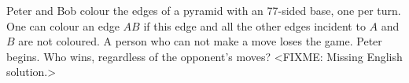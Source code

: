 \problem
Peter and Bob colour the edges of a pyramid with an 77-sided base, one per
turn.
One can colour an edge $AB$ if this edge and all the other edges incident to
$A$ and $B$ are not coloured.
A person who can not make a move loses the game.
Peter begins.
Who wins, regardless of the opponent's moves?
\solution
<FIXME: Missing English solution.>
\endproblem
